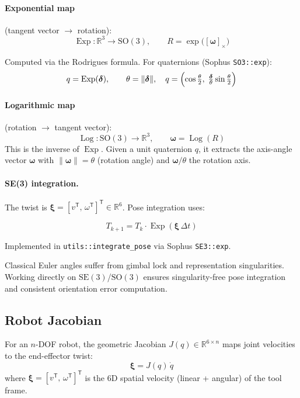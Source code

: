 \documentclass[11pt,a4paper]{article}
\newcommand{\R}{\mathbb{R}}
\newcommand{\SE}{\mathrm{SE}}
\newcommand{\SO}{\mathrm{SO}}
\newcommand{\Exp}{\operatorname{Exp}}
\newcommand{\Log}{\operatorname{Log}}
\newcommand{\tr}{\mathsf{T}}
\begin{document}
\paragraph{Exponential map} (tangent vector $\to$ rotation):
\[
  \Exp : \R^3 \to \SO(3),
  \qquad
  R = \exp\!\bigl([\bm{\omega}]_\times\bigr)
\]

Computed via the Rodrigues formula.  For quaternions (Sophus \texttt{SO3::exp}):
\[
  q = \Exp(\bm{\delta}),
  \qquad
  \theta = \|\bm{\delta}\|,
  \quad
  q = \Bigl(\cos\tfrac{\theta}{2},\;
             \tfrac{\bm{\delta}}{\theta}\sin\tfrac{\theta}{2}\Bigr)
\]

\paragraph{Logarithmic map} (rotation $\to$ tangent vector):
\[
  \Log : \SO(3) \to \R^3,
  \qquad
  \bm{\omega} = \Log(R)
\]
This is the inverse of $\Exp$.  Given a unit quaternion $q$, it extracts the
axis-angle vector $\bm{\omega}$ with $\|\bm{\omega}\| = \theta$ (rotation angle)
and $\bm{\omega}/\theta$ the rotation axis.

\paragraph{SE(3) integration.}
The twist is $\bm{\xi} = [v^\tr,\, \omega^\tr]^\tr \in \R^6$.
Pose integration uses:
\begin{keqbox}[SE(3) Integration]
\[
  T_{k+1} = T_k \cdot \Exp(\bm{\xi}\,\Delta t)
\]
\end{keqbox}

Implemented in \texttt{utils::integrate\_pose} via Sophus \texttt{SE3::exp}.

\begin{reasonbox}
Classical Euler angles suffer from gimbal lock and representation singularities.
Working directly on $\SE(3)$/$\SO(3)$ ensures singularity-free pose integration
and consistent orientation error computation.
\end{reasonbox}

\subsection{Robot Jacobian}
\label{sec:jacobian}

For an $n$-DOF robot, the geometric Jacobian $J(q) \in \R^{6\times n}$
maps joint velocities to the end-effector twist:
\[
  \bm{\xi} = J(q)\,\dot{q}
\]
where $\bm{\xi} = [v^\tr,\,\omega^\tr]^\tr$ is the 6D spatial velocity
(linear + angular) of the tool frame.
\end{document}
